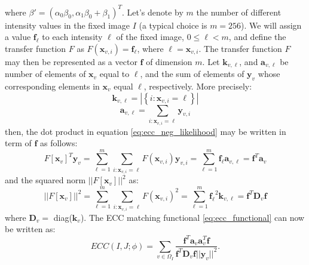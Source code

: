 where $\beta' = (\alpha_{0}\beta_{0}, \alpha_{1}\beta_{0} + \beta_{1})^{T}$. Let's denote by $m$ the number of different intensity values in the fixed image $I$ (a typical choice is $m=256$). We will assign a value $\mathbf{f}_{\ell}$ to each intensity $\ell$ of the fixed image, $0\leq \ell < m$, and define the transfer function $F$ as $F(\mathbf{x}_{v,i}) = \mathbf{f}_{\ell}$, where $\ell = \mathbf{x}_{v,i}$. The transfer function $F$ may then be represented as a vector $\mathbf{f}$ of dimension $m$. Let $\mathbf{k}_{v,\ell}$, and $\mathbf{a}_{v,\ell}$ be number of elements of $\mathbf{x}_{v}$ equal to $\ell$, and the sum of elements of $\mathbf{y}_{v}$ whose corresponding elements in $\mathbf{x}_{v}$ equal $\ell$, respectively. More precisely:
\begin{displaymath}
    \mathbf{k}_{v,\ell} = |\left\lbrace i : \mathbf{x}_{v,i}=\ell \right\rbrace|
\end{displaymath}
\begin{displaymath}
    \mathbf{a}_{v, \ell} = \sum_{i:\mathbf{x}_{v,i}=\ell} \mathbf{y}_{v,i}
\end{displaymath}
then, the dot product in equation \eqref{eq:ecc_neg_likelihood} may be written in term of $\mathbf{f}$ as follows:
\begin{displaymath}
    F\left[\mathbf{x}_{v}\right]^{T} \mathbf{y}_{v} = \sum_{\ell=1}^{m} \sum_{i:\mathbf{x}_{v,i}=\ell} F(\mathbf{x}_{v,i})\mathbf{y}_{v,i}
    =\sum_{\ell=1}^{m} \mathbf{f_{\ell}}\mathbf{a}_{v, \ell} = \mathbf{f}^{T}\mathbf{a}_{v}
\end{displaymath}
and the squared norm $||F[\mathbf{x}_{v}]||^{2}$ as:
\begin{displaymath}
    ||F\left[\mathbf{x}_{v}\right]||^{2} = \sum_{\ell=1}^{m} \sum_{i:\mathbf{x}_{v,i}=\ell} F(\mathbf{x}_{v,i})^{2}
    = \sum_{\ell=1}^{m} \mathbf{f_{\ell}}^{2} \mathbf{k}_{v, \ell} = \mathbf{f}^{T} \mathbf{D}_{v} \mathbf{f}
\end{displaymath}
where $\mathbf{D}_{v} = $ diag($\mathbf{k}_{v}$). The ECC matching functional \eqref{eq:ecc_functional} can now be written as:
\begin{equation}\label{eq:ecc_neg_likelihood_vector_form}
    ECC(I, J;\phi) = \sum_{v\in\Omega_{I}}\frac{\mathbf{f}^{T}\mathbf{a}_{v}\mathbf{a}_{v}^{T}\mathbf{f}}
    {\mathbf{f}^{T} \mathbf{D}_{v} \mathbf{f}||\mathbf{y}_{v}||^{2}}.
\end{equation}

